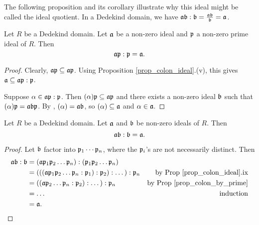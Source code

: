 The following proposition and its corollary illustrate why this ideal might be called the ideal quotient.
In a Dedekind domain, we have $\frak a \frak b : \frak b = \frac {\frak a \frak b}{\frak b} = \frak a$.

\begin{proposition}
  \label{prop_colon_by_prime}
  Let $R$ be a Dedekind domain.
  Let $\frak a$ be a non-zero ideal and $\frak p$ a non-zero prime ideal of $R$. Then
  \[ \frak a \frak p : \frak p = \frak a. \]
\end{proposition}
\begin{proof}
  Clearly, $\frak a \frak p \subseteq \frak a \frak p$.
  Using Proposition \ref{prop_colon_ideal}.(v),
  this gives $\frak a \subseteq \frak a \frak p : \frak p$.
  
  Suppose $\alpha \in \frak a \frak p : \frak p$.
  Then $(\alpha)\frak p \subseteq \frak a \frak p$
  and there exists a non-zero ideal $\frak b$ such that $(\alpha)\frak p = \frak a \frak b \frak p$.
  By , $(\alpha) = \frak a \frak b$,
  so $(\alpha) \subseteq \frak a$ and $\alpha \in \frak a$.
\end{proof}

\begin{corollary}
  \label{cor_ab_colon_b_is_a}
  Let $R$ be a Dedekind domain.
  Let $\frak a$ and $\frak b$ be non-zero ideals of $R$. Then
  \[ \frak a \frak b : \frak b = \frak a. \]
\end{corollary}
\begin{proof}
  Let $\frak b$ factor into $\frak p_1 \cdots \frak p_n$, where the $\frak p_i$'s are not necessarily distinct.
  Then
  \begin{align*}
    \frak a \frak b : \frak b
      &= (\frak a \frak p_1 \frak p_2 \dots \frak p_n) : (\frak p_1 \frak p_2 \dots \frak p_n) \\
      &= (((\frak a \frak p_1 \frak p_2 \dots \frak p_n : \frak p_1) : \frak p_2) : \dots) : \frak p_n
        & \text{by Prop \ref{prop_colon_ideal}.ix} \\
      &= ((\frak a \frak p_2 \dots \frak p_n : \frak p_2) : \dots) : \frak p_n
        & \text{by Prop \ref{prop_colon_by_prime}} \\
      &= \dots & \text{induction} \\
      &= \frak a.
  \end{align*}
\end{proof}


